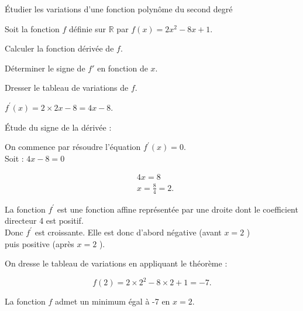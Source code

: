 \begin{methodeTitre}{Étudier les variations d'une fonction polynôme du second degré}
	
	Soit la fonction $f$ définie sur $\mathbb{R}$ par $f(x)=2 x^{2}-8 x+1$.
	\begin{enumMet}
		\item Calculer la fonction dérivée de $f$.
		\item Déterminer le signe de $f'$ en fonction de $x$.
		\item Dresser le tableau de variations de $f$.
	\end{enumMet}
	
	\begin{enumMet}
		\item $f^{\prime}(x)=2 \times 2 x-8=4 x-8$.
		\item Étude du signe de la dérivée :
		
		On commence par résoudre l'équation $f^{\prime}(x)=0$.\\
		Soit : $4 x-8=0$
		
		$$
		\begin{aligned}
			& 4 x=8 \\
			& x=\frac{8}{4}=2 .
		\end{aligned}
		$$
		
		La fonction $f^{\prime}$ est une fonction affine représentée par une droite dont le coefficient directeur 4 est positif.\\
		Donc $f^{\prime}$ est croissante. Elle est donc d'abord négative (avant $x=2$ )\\
		puis positive (après $x=2$ ).
		\item On dresse le tableau de variations en appliquant le théorème :
		\begin{center}
		\end{center}
		$$
		f(2)=2 \times 2^{2}-8 \times 2+1=-7 .
		$$
		
		La fonction $f$ admet un minimum égal à -7 en $x=2$.
	\end{enumMet}
\end{methodeTitre}

